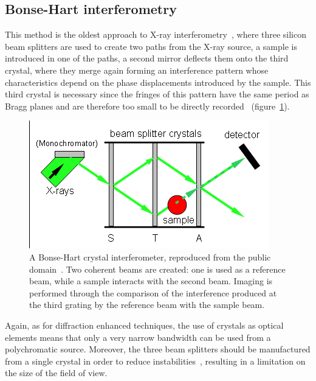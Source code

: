 \subsection{Bonse-Hart interferometry}
This method is the oldest approach to X-ray
interferometry~\parencite{1965ApPhL...7...99B,1965ApPhL...6..155B}, where three
silicon beam splitters are used to create two paths from the X-ray source, a
sample is introduced in one of the paths, a second mirror deflects them onto
the third crystal, where they merge again forming an interference pattern
whose characteristics depend on the phase displacements introduced by the
sample. This third crystal is necessary since the fringes of this pattern
have the same period as Bragg planes and are therefore too small to be
directly recorded~\parencite{1974ApOpt..13.2693B} (figure~\ref{fig:bonse-hart}).

\begin{figure}[htb]
    \centering
    \includegraphics[width=.8\textwidth]{gfx/Crystal_interferometer.png}
    \caption[Bonse-Hart interferometer.]{A Bonse-Hart crystal
        interferometer, reproduced from the public domain~\parencite{bonse-hart-picture}. Two coherent beams are created: one is used as a
reference beam, while a sample interacts with the second beam. Imaging is
performed through the
comparison of the interference produced at the third grating by the
reference beam with the sample beam.}
    \label{fig:bonse-hart}
\end{figure}

Again, as for diffraction enhanced techniques, the use of crystals as
optical elements means that only a very narrow bandwidth can be used from a
polychromatic source. Moreover, the three beam splitters should be
manufactured from a single crystal in order to reduce
instabilities~\parencite{1965ApPhL...7...99B},
resulting in a limitation on the size of the field of view.

